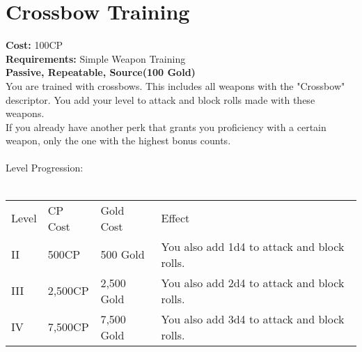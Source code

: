 \section{Crossbow Training}\label{perk:crossbowTraining}
\textbf{Cost:} 100CP\\
\textbf{Requirements:} Simple Weapon Training\\
\textbf{Passive, Repeatable, Source(100 Gold)}\\
You are trained with crossbows.
This includes all weapons with the "Crossbow" descriptor.
You add your level to attack and block rolls made with these weapons.\\
If you already have another perk that grants you proficiency with a certain weapon, only the one with the highest bonus counts.\\
\\
Level Progression:\\
\\
\begin{tabular}{l | l | l | l}
	Level & CP Cost & Gold Cost & Effect\\
	II & 500CP & 500 Gold & You also add 1d4 to attack and block rolls.\\
	III & 2,500CP & 2,500 Gold & You also add 2d4 to attack and block rolls.\\
	IV & 7,500CP & 7,500 Gold & You also add 3d4 to attack and block rolls.\\
\end{tabular}